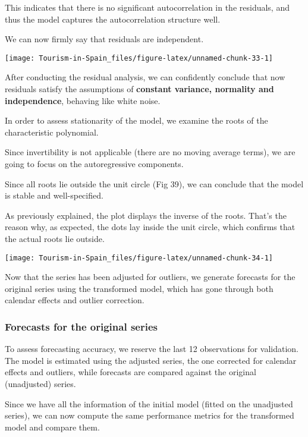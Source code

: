 \documentclass[
]{article}
\begin{document}
This indicates that there is no significant autocorrelation in the
residuals, and thus the model captures the autocorrelation structure
well.

We can now firmly say that residuals are independent.

\begin{center}\texttt{[image: Tourism-in-Spain\_files/figure-latex/unnamed-chunk-33-1]} \end{center}

After conducting the residual analysis, we can confidently conclude that
now residuals satisfy the assumptions of \textbf{constant variance,
normality and independence}, behaving like white noise.

In order to assess stationarity of the model, we examine the roots of
the characteristic polynomial.

Since invertibility is not applicable (there are no moving average
terms), we are going to focus on the autoregressive components.

Since all roots lie outside the unit circle (Fig 39), we can conclude
that the model is stable and well-specified.

As previously explained, the plot displays the inverse of the roots.
That's the reason why, as expected, the dots lay inside the unit circle,
which confirms that the actual roots lie outside.

\begin{center}\texttt{[image: Tourism-in-Spain\_files/figure-latex/unnamed-chunk-34-1]} \end{center}

Now that the series has been adjusted for outliers, we generate
forecasts for the original series using the transformed model, which has
gone through both calendar effects and outlier correction.

\hypertarget{forecasts-for-the-original-series}{%
\subsubsection{Forecasts for the original
series}\label{forecasts-for-the-original-series}}

To assess forecasting accuracy, we reserve the last 12 observations for
validation. The model is estimated using the adjusted series, the one
corrected for calendar effects and outliers, while forecasts are
compared against the original (unadjusted) series.

Since we have all the information of the initial model (fitted on the
unadjusted series), we can now compute the same performance metrics for
the transformed model and compare them.
\end{document}
